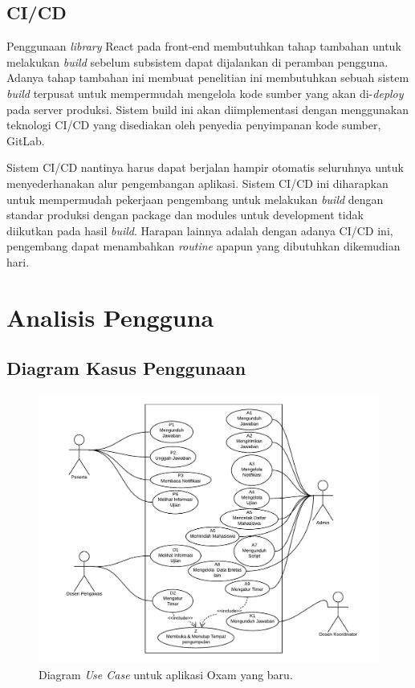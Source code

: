 \subsection{CI/CD}
    Penggunaan \textit{library} React pada front-end membutuhkan tahap tambahan
    untuk melakukan \textit{build} sebelum subsistem dapat dijalankan di
    peramban pengguna. Adanya tahap tambahan ini membuat penelitian ini
    membutuhkan sebuah sistem \textit{build} terpusat untuk mempermudah
    mengelola kode sumber yang akan di-\textit{deploy} pada server produksi.
    Sistem build ini akan diimplementasi dengan menggunakan teknologi CI/CD yang
    disediakan oleh penyedia penyimpanan kode sumber, GitLab.
    
    Sistem CI/CD nantinya harus dapat berjalan hampir otomatis seluruhnya untuk
    menyederhanakan alur pengembangan aplikasi. Sistem CI/CD ini diharapkan
    untuk mempermudah pekerjaan pengembang untuk melakukan \textit{build} dengan
    standar produksi dengan package dan modules untuk development tidak
    diikutkan pada hasil \textit{build}. Harapan lainnya adalah dengan adanya
    CI/CD ini, pengembang dapat menambahkan \textit{routine} apapun yang
    dibutuhkan dikemudian hari.

\section{Analisis Pengguna}

\subsection{Diagram Kasus Penggunaan}
\begin{figure}
    \centering
    \includegraphics[width=0.75\paperwidth]{Gambar/UseCase - RevB.pdf}
    \caption{Diagram \textit{Use Case} untuk aplikasi Oxam yang baru.}
    \label{fig:my_label}
\end{figure}

